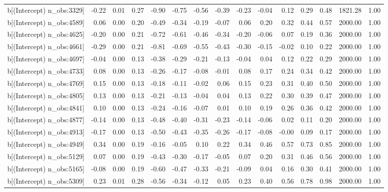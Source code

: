 \begin{table}[ht]
\begin{tabular}{rrrrrrrrrrrrrrr}
  b[(Intercept) n\_obs:3329] & -0.22 & 0.01 & 0.27 & -0.90 & -0.75 & -0.56 & -0.39 & -0.23 & -0.04 & 0.12 & 0.29 & 0.48 & 1821.28 & 1.00 \\ 
  b[(Intercept) n\_obs:4589] & 0.06 & 0.00 & 0.20 & -0.49 & -0.34 & -0.19 & -0.07 & 0.06 & 0.20 & 0.32 & 0.44 & 0.57 & 2000.00 & 1.00 \\ 
  b[(Intercept) n\_obs:4625] & -0.20 & 0.00 & 0.21 & -0.72 & -0.61 & -0.46 & -0.34 & -0.20 & -0.06 & 0.07 & 0.19 & 0.36 & 2000.00 & 1.00 \\ 
  b[(Intercept) n\_obs:4661] & -0.29 & 0.00 & 0.21 & -0.81 & -0.69 & -0.55 & -0.43 & -0.30 & -0.15 & -0.02 & 0.10 & 0.22 & 2000.00 & 1.00 \\ 
  b[(Intercept) n\_obs:4697] & -0.04 & 0.00 & 0.13 & -0.38 & -0.29 & -0.21 & -0.13 & -0.04 & 0.04 & 0.12 & 0.22 & 0.29 & 2000.00 & 1.00 \\ 
  b[(Intercept) n\_obs:4733] & 0.08 & 0.00 & 0.13 & -0.26 & -0.17 & -0.08 & -0.01 & 0.08 & 0.17 & 0.24 & 0.34 & 0.42 & 2000.00 & 1.00 \\ 
  b[(Intercept) n\_obs:4769] & 0.15 & 0.00 & 0.13 & -0.18 & -0.11 & -0.02 & 0.06 & 0.15 & 0.23 & 0.31 & 0.40 & 0.50 & 2000.00 & 1.00 \\ 
  b[(Intercept) n\_obs:4805] & 0.13 & 0.00 & 0.13 & -0.21 & -0.13 & -0.04 & 0.04 & 0.13 & 0.22 & 0.30 & 0.39 & 0.47 & 2000.00 & 1.00 \\ 
  b[(Intercept) n\_obs:4841] & 0.10 & 0.00 & 0.13 & -0.24 & -0.16 & -0.07 & 0.01 & 0.10 & 0.19 & 0.26 & 0.36 & 0.42 & 2000.00 & 1.00 \\ 
  b[(Intercept) n\_obs:4877] & -0.14 & 0.00 & 0.13 & -0.48 & -0.40 & -0.31 & -0.23 & -0.14 & -0.06 & 0.02 & 0.11 & 0.20 & 2000.00 & 1.00 \\ 
  b[(Intercept) n\_obs:4913] & -0.17 & 0.00 & 0.13 & -0.50 & -0.43 & -0.35 & -0.26 & -0.17 & -0.08 & -0.00 & 0.09 & 0.17 & 2000.00 & 1.00 \\ 
  b[(Intercept) n\_obs:4949] & 0.34 & 0.00 & 0.19 & -0.16 & -0.05 & 0.10 & 0.22 & 0.34 & 0.46 & 0.57 & 0.73 & 0.85 & 2000.00 & 1.00 \\ 
  b[(Intercept) n\_obs:5129] & 0.07 & 0.00 & 0.19 & -0.43 & -0.30 & -0.17 & -0.05 & 0.07 & 0.20 & 0.31 & 0.46 & 0.56 & 2000.00 & 1.00 \\ 
  b[(Intercept) n\_obs:5165] & -0.08 & 0.00 & 0.19 & -0.60 & -0.47 & -0.33 & -0.21 & -0.09 & 0.04 & 0.16 & 0.30 & 0.41 & 2000.00 & 1.00 \\ 
  b[(Intercept) n\_obs:5309] & 0.23 & 0.01 & 0.28 & -0.56 & -0.34 & -0.12 & 0.05 & 0.23 & 0.40 & 0.56 & 0.78 & 0.98 & 2000.00 & 1.00 \\ 

\end{tabular}
\end{table}
